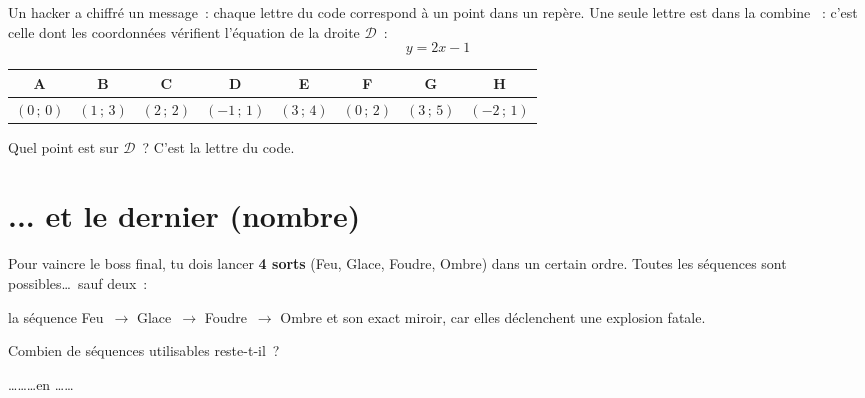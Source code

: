 Un hacker a chiffré un message~: chaque lettre du code correspond
à un point dans un repère. Une seule lettre est \og dans la combine \fg~:
c'est celle dont les coordonnées vérifient l'équation de la droite
$\mathcal{D}$~:
\[
	y = 2x - 1
\]

\medskip
\begin{center}
	\begin{tabular}{|c|c|c|c|c|c|c|c|}
		\hline
		\textbf{A}  & \textbf{B}  & \textbf{C}  & \textbf{D}
		            & \textbf{E}  & \textbf{F}  & \textbf{G}   & \textbf{H}   \\
		\hline
		$(0\,;\,0)$ & $(1\,;\,3)$ & $(2\,;\,2)$ & $(-1\,;\,1)$
		            & $(3\,;\,4)$ & $(0\,;\,2)$ & $(3\,;\,5)$  & $(-2\,;\,1)$ \\
		\hline
	\end{tabular}
\end{center}

\medskip
Quel point est sur $\mathcal{D}$~? C'est la lettre du code.

\vspace*{0.5cm}

\section{ ... et le dernier (nombre)}

Pour vaincre le boss final, tu dois lancer \textbf{4 sorts}
(Feu, Glace, Foudre, Ombre) dans un certain ordre.
Toutes les séquences sont possibles\ldots\ sauf deux~:

la séquence Feu~$\to$ Glace~$\to$ Foudre~$\to$ Ombre et son exact miroir, car elles déclenchent une explosion fatale.

Combien de séquences utilisables reste-t-il~?

\vspace*{2cm}

\centering\Huge{\ldots \quad \ldots \quad \ldots \quad en \quad  \ldots \quad \ldots}


